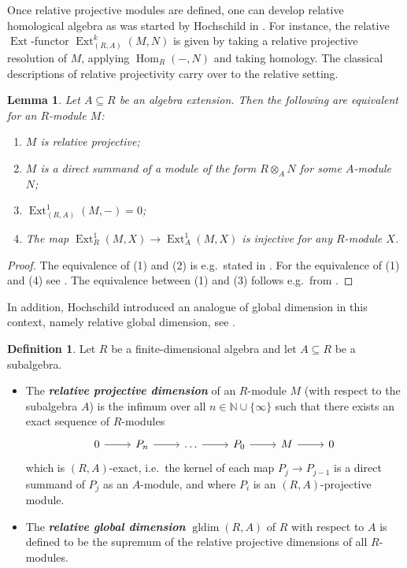 \documentclass[12pt,a4paper]{amsart}
\theoremstyle{plain}
\newtheorem{lem}[thm]{Lemma}
\theoremstyle{definition}
\newtheorem{defn}[thm]{Definition}
\numberwithin{equation}{thm}
\newcommand{\emphbf}[1]{\emph{\textbf{#1}}}
\DeclareMathOperator{\Hom}{Hom}
\DeclareMathOperator{\Ext}{Ext}
\DeclareMathOperator{\gldim}{gldim}
\begin{document}
Once relative projective modules are defined, one can develop relative homological algebra as was started by Hochschild in \cite{Hoc56}. For instance, the relative $\Ext$-functor $\Ext^k_{(R,A)}(M,N)$ is given by taking a relative projective resolution of $M$, applying $\Hom_R(-,N)$ and taking homology. The classical descriptions of relative projectivity carry over to the relative setting. 

\begin{lem}
Let $A\subseteq R$ be an algebra extension. Then the following are equivalent for an $R$-module $M$:
\begin{enumerate}[(1)]
\item $M$ is relative projective;
\item $M$ is a direct summand of a module of the form $R\otimes_A N$ for some $A$-module $N$;
\item $\Ext_{(R,A)}^1(M,-)=0$;
\item The map $\Ext^1_R(M,X)\to \Ext^1_A(M,X)$ is injective for any $R$-module $X$. 
\end{enumerate} 
\end{lem}

\begin{proof}
The equivalence of (1) and (2) is e.g.\ stated in \cite[Lemma 1.1]{The85}. For the equivalence of (1) and (4) see \cite[Remark 2.4]{Zim20}. The equivalence between (1) and (3) follows e.g.\ from \cite[Proposition 3.1, Theorem 3.9]{Hol08}.
\end{proof}


 In addition, Hochschild introduced an analogue of global dimension in this context, namely relative global dimension, see \cite[p.~258]{Hoc56}.

\begin{defn}
Let $R$ be a finite-dimensional algebra and let $A\subseteq R$ be a subalgebra. 
\begin{itemize}
\item The \emphbf{relative projective dimension} of an $R$-module $M$ (with respect to the subalgebra $A$) is the infimum over all $n\in \mathbb{N} \cup \{\infty\}$ such that there exists an exact sequence of $R$-modules
\[
\begin{tikzcd}
0\arrow{r} &P_n\arrow{r} &\dots\arrow{r} &P_0\arrow{r} &M\arrow{r} &0
\end{tikzcd}
\]
which is $(R,A)$-exact, i.e.\ the kernel of each map $P_j\to P_{j-1}$ is a direct summand of $P_j$ as an $A$-module, and where $P_i$ is an $(R,A)$-projective module. 
\item The \emphbf{relative global dimension} $\gldim(R,A)$ of $R$ with respect to $A$ is defined to be the supremum of the relative projective dimensions of all $R$-modules. 
\end{itemize}
\end{defn}
\end{document}
